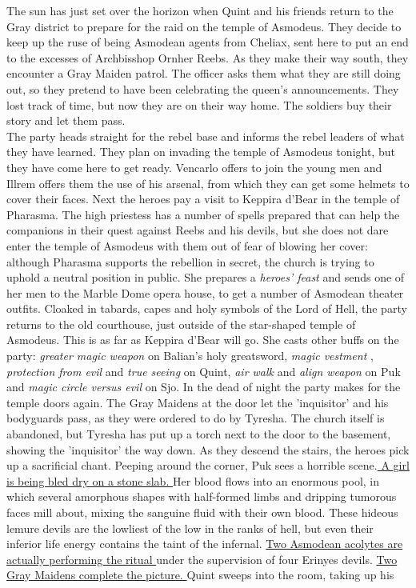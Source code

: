 The sun has just set over the horizon when Quint and his friends return to the Gray district to prepare for the raid on the temple of Asmodeus. They decide to keep up the ruse of being Asmodean agents from Cheliax, sent here to put an end to the excesses of Archbisshop Ornher Reebs. As they make their way south, they encounter a Gray Maiden patrol. The officer asks them what they are still doing out, so they pretend to have been celebrating the queen's announcements. They lost track of time, but now they are on their way home. The soldiers buy their story and let them pass.\\

The party heads straight for the rebel base and informs the rebel leaders of what they have learned. They plan on invading the temple of Asmodeus tonight, but they have come here to get ready. Vencarlo offers to join the young men and Illrem offers them the use of his arsenal, from which they can get some helmets to cover their faces. Next the heroes pay a visit to Keppira d'Bear in the temple of Pharasma. The high priestess has a number of spells prepared that can help the companions in their quest against Reebs and his devils, but she does not dare enter the temple of Asmodeus with them out of fear of blowing her cover: although Pharasma supports the rebellion in secret, the church is trying to uphold a neutral position in public. She prepares a {\itshape heroes' feast} and sends one of her men to the Marble Dome opera house, to get a number of Asmodean theater outfits. Cloaked in tabards, capes and holy symbols of the Lord of Hell, the party returns to the old courthouse, just outside of the star-shaped temple of Asmodeus. This is as far as Keppira d'Bear will go. She casts other buffs on the party:  {\itshape greater magic weapon} on Balian's holy greatsword,  {\itshape magic vestment} ,  {\itshape protection from evil} and  {\itshape true seeing} on Quint,  {\itshape air walk} and  {\itshape align weapon} on Puk and  {\itshape magic circle versus evil} on Sjo. In the dead of night the party makes for the temple doors again. The Gray Maidens at the door let the 'inquisitor' and his bodyguards pass, as they were ordered to do by Tyresha. The church itself is abandoned, but Tyresha has put up a torch next to the door to the basement, showing the 'inquisitor' the way down. As they descend the stairs, the heroes pick up a sacrificial chant. Peeping around the corner, Puk sees a horrible scene.\hyperref[fig:Bloody-sacrifice-for-Asmodeus-616078986]{ A girl is being bled dry on a stone slab. } Her blood flows into an enormous pool, in which several amorphous shapes with half-formed limbs and dripping tumorous faces mill about, mixing the sanguine fluid with their own blood. These hideous lemure devils are the lowliest of the low in the ranks of hell, but even their inferior life energy contains the taint of the infernal. \hyperref[fig:Bloody-sacrifice-for-Asmodeus-2-616080218]{ Two Asmodean acolytes are actually performing the ritual } under the supervision of four Erinyes devils. \hyperref[fig:Asmodean-catacombs-blood-sarcifices-616082201]{ Two Gray Maidens complete the picture. } Quint sweeps into the room, taking up his 